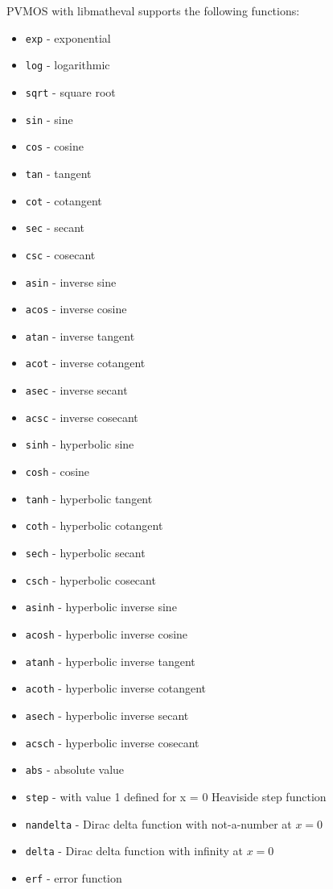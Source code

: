 \documentclass[noshowpacs,preprintnumbers,amsmath,amssymb, letter]{revtex4}
\begin{document}
PVMOS with libmatheval supports the following functions:
\begin{itemize}
\item{} \texttt{exp} - exponential
\item{} \texttt{log} - logarithmic
\item{} \texttt{sqrt} - square root
\item{} \texttt{sin} - sine
\item{} \texttt{cos} - cosine
\item{} \texttt{tan} - tangent
\item{} \texttt{cot} - cotangent
\item{} \texttt{sec} - secant
\item{} \texttt{csc} - cosecant
\item{} \texttt{asin} - inverse sine
\item{} \texttt{acos} - inverse cosine
\item{} \texttt{atan} - inverse tangent
\item{} \texttt{acot} - inverse cotangent
\item{} \texttt{asec} - inverse secant
\item{} \texttt{acsc} - inverse cosecant
\item{} \texttt{sinh} - hyperbolic sine
\item{} \texttt{cosh} - cosine
\item{} \texttt{tanh} - hyperbolic tangent
\item{} \texttt{coth} - hyperbolic cotangent
\item{} \texttt{sech} - hyperbolic secant
\item{} \texttt{csch} - hyperbolic cosecant
\item{} \texttt{asinh} - hyperbolic inverse sine
\item{} \texttt{acosh} - hyperbolic inverse cosine
\item{} \texttt{atanh} - hyperbolic inverse tangent
\item{} \texttt{acoth} - hyperbolic inverse cotangent
\item{} \texttt{asech} - hyperbolic inverse secant
\item{} \texttt{acsch} - hyperbolic inverse cosecant
\item{} \texttt{abs} - absolute value
\item{} \texttt{step} - with value 1 defined for x = 0 Heaviside step function
\item{} \texttt{nandelta}  - Dirac delta function with not-a-number at $x = 0$
\item{} \texttt{delta} - Dirac delta function with infinity at $x = 0$ 
\item{} \texttt{erf} - error function
\end{itemize}
\end{document}

